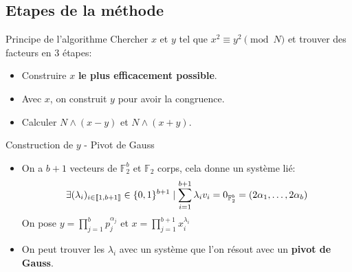 \documentclass{beamer}
\begin{document}
\subsection{Etapes de la méthode}
\begin{frame}{Principe de l'algorithme}
    Chercher $x$ et $y$ tel que $x^2 \equiv y^2 \pmod N$ et trouver des facteurs en 3 étapes:

    \begin{itemize}
        \item Construire $x$ \textbf{le plus efficacement possible}.
        \item Avec $x$, on construit $y$ pour avoir la congruence.
        \item Calculer $N \land (x-y)$ et $N\land (x+y)$.
    \end{itemize}
    
\end{frame}



\begin{frame}{Construction de $y$ - Pivot de Gauss}
    \begin{itemize}[<+->]
        \item On a $b+1$ vecteurs de $\mathbb F_2^b$ et $\mathbb F_2$ corps, cela donne un système lié:
        $$
        \exists (\lambda_i)_{i \in \llbracket 1,b+1 \rrbracket}\in \mathbb \{0,1\}^{b+1} \mid \sum_{i=1}^{b+1} \lambda_iv_i = 0_{\mathbb F_2^b} = (2\alpha_1, \dots, 2\alpha_b)
        $$
        On pose $y = \prod_{j=1}^b p_j^{\alpha_j}$ et $x = \prod_{j=1}^{b+1}x_i^{\lambda_i}$ 
        \item On peut trouver les $\lambda_i$ avec un système que l'on résout avec un \textbf{pivot de Gauss}.
    \end{itemize}
\end{frame}
\end{document}
